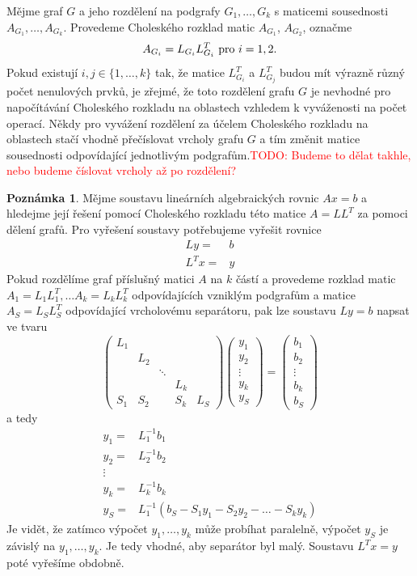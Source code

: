 \documentclass[11pt,american,czech,oneside]{book}
\theoremstyle{plain}
\theoremstyle{definition}
\newtheorem{remark}{Poznámka}
\newcommand{\TODO}[1]{\textcolor{red}{TODO: #1}}
\begin{document}
Mějme graf $G$ a jeho rozdělení na podgrafy $G_1, \ldots, G_k$ s maticemi sousednosti $A_{G_1}, \ldots, A_{G_k}$. Provedeme Choleského rozklad matic $A_{G_1}$, $A_{G_2}$, označme
\[
  A_{G_i} = L_{G_i}L_{G_i}^T \ {\rm pro} \ i = 1,2.
\]
Pokud existují $i,j \in \{1,\ldots,k \}$ tak, že matice $L_{G_i}^T$ a $L_{G_j}^T$ budou mít výrazně různý počet nenulových prvků, je zřejmé, že toto rozdělení grafu $G$ je nevhodné pro napočítávání Choleského rozkladu na oblastech vzhledem k vyváženosti na počet operací. Někdy pro vyvážení rozdělení za účelem Choleského rozkladu na oblastech stačí vhodně přečíslovat vrcholy grafu $G$ a tím změnit matice sousednosti odpovídající jednotlivým podgrafům.\TODO{Budeme to dělat takhle, nebo budeme číslovat vrcholy až po rozdělení?}

\begin{remark}
Mějme soustavu lineárních algebraických rovnic $Ax=b$ a hledejme její řešení pomocí Choleského rozkladu této matice $A=LL^T$ za pomoci dělení grafů. Pro vyřešení soustavy potřebujeme vyřešit rovnice
\begin{align*}
  Ly =& b \\
  L^Tx= & y
\end{align*}
Pokud rozdělíme graf příslušný matici $A$ na $k$ částí a provedeme rozklad matic $A_1=L_1 L_1^T, \ldots A_k=L_k L_k^T$ odpovídajících vzniklým podgrafům a matice $A_S=L_S L_S^T$ odpovídající vrcholovému separátoru, pak lze soustavu $Ly=b$ napsat ve tvaru
\[
\begin{pmatrix}
  L_1 &     &        &      & \\
      & L_2 &        &      & \\
      &     & \ddots &      & \\
      &     &        & L_k  & \\
  S_1 & S_2 &        & S_k  & L_S
\end{pmatrix}
\begin{pmatrix}
  y_1 \\
  y_2 \\
  \vdots \\
  y_k \\
  y_S
\end{pmatrix}
=
\begin{pmatrix}
  b_1 \\
  b_2 \\
  \vdots \\
  b_k \\
  b_S
\end{pmatrix}
\]
a tedy
\begin{align*}
  y_1= & L_1^{-1}b_1 \\
  y_2= & L_2^{-1}b_2 \\
  \vdots \\
  y_k= & L_k^{-1}b_k \\
  y_S= & L_1^{-1}(b_S - S_1 y_1 - S_2 y_2 - \ldots - S_k y_k)
\end{align*}
Je vidět, že zatímco výpočet $y_1, \ldots, y_k$ může probíhat paralelně, výpočet $y_S$ je závislý na $y_1, \ldots, y_k$. Je tedy vhodné, aby separátor byl malý.
Soustavu $L^Tx=y$ poté vyřešíme obdobně.
\end{remark}
\end{document}
